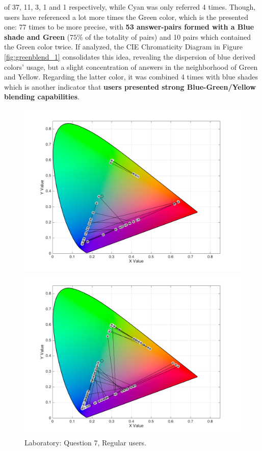 of 37, 11, 3, 1 and 1 respectively, while Cyan was only referred 4 times. Though, users have referenced a lot more times the
Green color, which is the presented one: 77 times to be more precise, with \textbf{53 answer-pairs formed with a Blue shade and Green} ($75\%$ of the
totality of pairs) and 10 pairs which contained the Green color twice. If analyzed, the CIE Chromaticity Diagram in Figure \ref{fig:greenblend_1} consolidates
this idea, revealing the dispersion of blue derived colors' usage, but a slight concentration of answers in the neighborhood of Green and Yellow.
Regarding the latter color, it was combined 4 times with blue shades which is another indicator that \textbf{users presented strong Blue-Green/Yellow blending
capabilities}.
%
\begin{figure}[!htbp]
  \centering
  \vspace{-5pt}
  \begin{minipage}{0.4\textwidth}
    \centering
    \includegraphics[width=\textwidth]{images/results/7_lab_regularUsers.png}
    \caption[Laboratory: Answers for Question 7, from regular users.]{Laboratory: Question 7, Regular users.}
    \label{fig:blueblend_1}
  \end{minipage}
  \begin{minipage}{0.4\textwidth}
    \centering
    \includegraphics[width=\textwidth]{images/results/7_online_regularUsers.png}

\end{minipage}
\end{figure}
